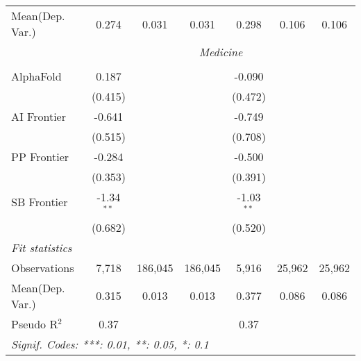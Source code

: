 \begin{tabular}{lcccccc}
Mean(Dep. Var.) & 0.274 & 0.031 & 0.031 & 0.298 & 0.106 & 0.106 \\
 & \multicolumn{6}{c}{\textit{Medicine}} \\ \\
   AlphaFold    & 0.187        &         &         & -0.090       &        &   \\   
                & (0.415)      &         &         & (0.472)      &        &   \\   
   AI Frontier  & -0.641       &         &         & -0.749       &        &   \\   
                & (0.515)      &         &         & (0.708)      &        &   \\   
   PP Frontier  & -0.284       &         &         & -0.500       &        &   \\   
                & (0.353)      &         &         & (0.391)      &        &   \\   
   SB Frontier  & -1.34$^{**}$ &         &         & -1.03$^{**}$ &        &   \\   
                & (0.682)      &         &         & (0.520)      &        &   \\   
   \midrule
   \emph{Fit statistics}\\
   Observations & 7,718        & 186,045 & 186,045 & 5,916        & 25,962 & 25,962\\  
Mean(Dep. Var.) & 0.315 & 0.013 & 0.013 & 0.377 & 0.086 & 0.086 \\
   Pseudo R$^2$ & 0.37         &         &         & 0.37         &        & \\  
   \midrule \midrule
   \multicolumn{7}{l}{\emph{Signif. Codes: ***: 0.01, **: 0.05, *: 0.1}}\\
\end{tabular}
\par\endgroup
